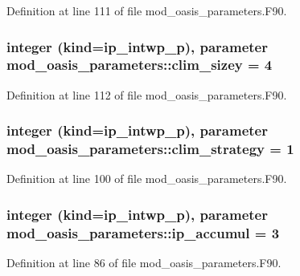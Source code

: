 Definition at line 111 of file mod\+\_\+oasis\+\_\+parameters.\+F90.

\hypertarget{classmod__oasis__parameters_a206910560c246db3404224a04cfd4319}{
\subsubsection[{clim\+\_\+sizey}]{\setlength{\rightskip}{0pt plus 5cm}integer (kind=ip\+\_\+intwp\+\_\+p), parameter mod\+\_\+oasis\+\_\+parameters\+::clim\+\_\+sizey = 4}}\label{classmod__oasis__parameters_a206910560c246db3404224a04cfd4319}


Definition at line 112 of file mod\+\_\+oasis\+\_\+parameters.\+F90.

\hypertarget{classmod__oasis__parameters_a611cae6f3c65a75f26e76b2f88f34037}{
\subsubsection[{clim\+\_\+strategy}]{\setlength{\rightskip}{0pt plus 5cm}integer (kind=ip\+\_\+intwp\+\_\+p), parameter mod\+\_\+oasis\+\_\+parameters\+::clim\+\_\+strategy = 1}}\label{classmod__oasis__parameters_a611cae6f3c65a75f26e76b2f88f34037}


Definition at line 100 of file mod\+\_\+oasis\+\_\+parameters.\+F90.

\hypertarget{classmod__oasis__parameters_adfaf98517b8396e4ba667f2f8bcd0ed5}{
\subsubsection[{ip\+\_\+accumul}]{\setlength{\rightskip}{0pt plus 5cm}integer (kind=ip\+\_\+intwp\+\_\+p), parameter mod\+\_\+oasis\+\_\+parameters\+::ip\+\_\+accumul = 3}}\label{classmod__oasis__parameters_adfaf98517b8396e4ba667f2f8bcd0ed5}


Definition at line 86 of file mod\+\_\+oasis\+\_\+parameters.\+F90.

